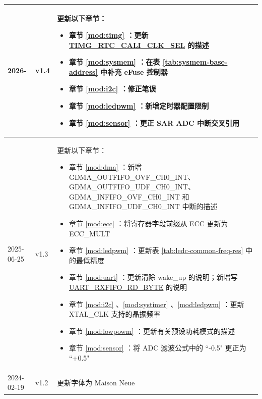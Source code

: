 \begin{longtable}[l]{ | m{2cm} | m{1.5cm} | m{12cm} | }
    2026- & v1.4 &
    更新以下章节：
    \begin{itemize}
        \item 章节 \ref{mod:timg} \textit{\nameref{mod:timg}}：更新 \hyperref[fielddesc:TIMGRTCCALICLKSEL]{TIMG\_RTC\_CALI\_CLK\_SEL} 的描述 %
        \item 章节 \ref{mod:sysmem} \textit{\nameref{mod:sysmem}}：在表 \ref{tab:sysmem-base-address} 中补充 eFuse 控制器 %
        \item 章节 \ref{mod:i2c} \textit{\nameref{mod:i2c}}：修正笔误 %
        \item 章节 \ref{mod:ledpwm} \textit{\nameref{mod:ledpwm}}：新增定时器配置限制 %
        \item 章节 \ref{mod:sensor} \textit{\nameref{mod:sensor}}：更正 SAR ADC 中断交叉引用 %
    \end{itemize}
    \\\hline
    2025-06-25 & v1.3 &
     更新以下章节：
     \begin{itemize}
        \item 章节 \ref{mod:dma} \textit{\nameref{mod:dma}}：新增 GDMA\_OUTFIFO\_OVF\_CH0\_INT、GDMA\_OUTFIFO\_UDF\_CH0\_INT、GDMA\_INFIFO\_OVF\_CH0\_INT 和 GDMA\_INFIFO\_UDF\_CH0\_INT 中断的描述 %
        \item 章节 \ref{mod:ecc} \nameref{mod:ecc}：将寄存器字段前缀从 ECC 更新为 ECC\_MULT %
         \item 章节 \ref{mod:ledpwm} \textit{\nameref{mod:ledpwm}}：更新表 \ref{tab:ledc-common-freq-res} 中的最低精度  %
         \item 章节 \ref{mod:uart} \textit{\nameref{mod:uart}}：更新清除 wake\_up 的说明；新增写 \hyperref[fielddesc:UARTRXFIFORDBYTE]{UART\_RXFIFO\_RD\_BYTE} 的说明 %
         \item 章节 \ref{mod:i2c} \textit{\nameref{mod:i2c}}、\ref{mod:systimer} \textit{\nameref{mod:systimer}}、\ref{mod:ledpwm} \textit{\nameref{mod:ledpwm}}：更新 XTAL\_CLK 支持的晶振频率 %
         \item 章节 \ref{mod:lowpowm} \textit{\nameref{mod:lowpowm}}：更新有关预设功耗模式的描述 %
         \item 章节 \ref{mod:sensor} \textit{\nameref{mod:sensor}}：将 ADC 滤波公式中的 ``-0.5" 更正为 ``+0.5" %
     \end{itemize}
     \\\hline
     2024-02-19 & v1.2 &
     更新字体为 Maison Neue %

\end{longtable}
